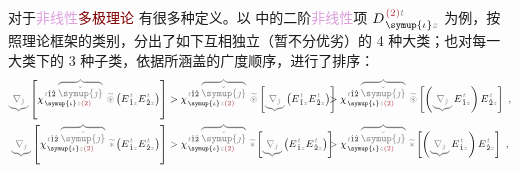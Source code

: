 对于\textcolor{Plum}{非线性}\textcolor{Maroon}{多极理论}  有很多种定义。以  中的二阶\textcolor{Plum}{非线性}项 $D^{\;\! \textcolor{Maroon}{(2)} \mathcolor{gray}{t}}_{\;\! \symup{\iota}\mathcolor{gray}{z}}$ 为例，按照\textcolor{NavyBlue}{理论框架}的类别，分出了如下互相独立（暂不分优劣）的 4 种大类；也对每一大类下的 3 种子类，依据所涵盖的广度顺序，进行了排序：
\begin{subequations}
	\small
\begin{align}
	\mathcolor{gray}{\underbrace{\nabla_{\check{\jmath}}}} \left[ \chi^{\;\! \mathcolor{gray}{t} \hat{1} \hat{2} \;\! \mathcolor{gray}{\overbrace{\check{\symup{\jmath}}}}}_{\;\! \symup{\iota} \mathcolor{gray}{z} \textcolor{Maroon}{(2)}} ~\mathcolor{gray}{\widetilde \circledast} \left( E^{\;\!\mathcolor{gray}{t}}_{\;\! \hat{1} \mathcolor{gray}{z}} E^{\;\!\mathcolor{gray}{t}}_{\;\! \hat{2} \mathcolor{gray}{z}} \right) \right] &> \chi^{\;\! \mathcolor{gray}{t} \hat{1} \hat{2} \;\! \mathcolor{gray}{\overbrace{\check{\symup{\jmath}}}}}_{\;\! \symup{\iota} \mathcolor{gray}{z} \textcolor{Maroon}{(2)}} ~\mathcolor{gray}{\widetilde \circledast} \left[ \mathcolor{gray}{\underbrace{\nabla_{\check{\jmath}}}} \left( E^{\;\!\mathcolor{gray}{t}}_{\;\! \hat{1} \mathcolor{gray}{z}} E^{\;\!\mathcolor{gray}{t}}_{\;\! \hat{2} \mathcolor{gray}{z}} \right) \right] \hspace{-2em}&&> \chi^{\;\! \mathcolor{gray}{t} \hat{1} \hat{2} \;\! \mathcolor{gray}{\overbrace{\check{\symup{\jmath}}}}}_{\;\! \symup{\iota} \mathcolor{gray}{z} \textcolor{Maroon}{(2)}} ~\mathcolor{gray}{\widetilde \circledast} \left[ \left( \mathcolor{gray}{\underbrace{\nabla_{\check{\jmath}}}} E^{\;\!\mathcolor{gray}{t}}_{\;\! \hat{1} \mathcolor{gray}{z}} \right) E^{\;\!\mathcolor{gray}{t}}_{\;\! \hat{2} \mathcolor{gray}{z}} \right]~, \label{eq:Volterra} \\
	\mathcolor{gray}{\underbrace{\nabla_{\check{\jmath}}}} \left[ \chi^{\;\! \mathcolor{gray}{t} \hat{1} \hat{2} \;\! \mathcolor{gray}{\overbrace{\check{\symup{\jmath}}}}}_{\;\! \symup{\iota} \mathcolor{gray}{z} \textcolor{Maroon}{(2)}} ~\mathcolor{gray}{\widetilde *} \left( E^{\;\!\mathcolor{gray}{t}}_{\;\! \hat{1} \mathcolor{gray}{z}} E^{\;\!\mathcolor{gray}{t}}_{\;\! \hat{2} \mathcolor{gray}{z}} \right) \right] &> \chi^{\;\! \mathcolor{gray}{t} \hat{1} \hat{2} \;\! \mathcolor{gray}{\overbrace{\check{\symup{\jmath}}}}}_{\;\! \symup{\iota} \mathcolor{gray}{z} \textcolor{Maroon}{(2)}} ~\mathcolor{gray}{\widetilde *} \left[ \mathcolor{gray}{\underbrace{\nabla_{\check{\jmath}}}} \left( E^{\;\!\mathcolor{gray}{t}}_{\;\! \hat{1} \mathcolor{gray}{z}} E^{\;\!\mathcolor{gray}{t}}_{\;\! \hat{2} \mathcolor{gray}{z}} \right) \right] \hspace{-2em}&&> \chi^{\;\! \mathcolor{gray}{t} \hat{1} \hat{2} \;\! \mathcolor{gray}{\overbrace{\check{\symup{\jmath}}}}}_{\;\! \symup{\iota} \mathcolor{gray}{z} \textcolor{Maroon}{(2)}} ~\mathcolor{gray}{\widetilde *} \left[ \left( \mathcolor{gray}{\underbrace{\nabla_{\check{\jmath}}}} E^{\;\!\mathcolor{gray}{t}}_{\;\! \hat{1} \mathcolor{gray}{z}} \right) E^{\;\!\mathcolor{gray}{t}}_{\;\! \hat{2} \mathcolor{gray}{z}} \right]~, \label{eq:Volterra-time} \\

\end{align}
\end{subequations}
